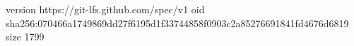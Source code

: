 version https://git-lfs.github.com/spec/v1
oid sha256:070466a1749869dd27f6195d1f33744858f0903c2a85276691841fd4676d6819
size 1799
